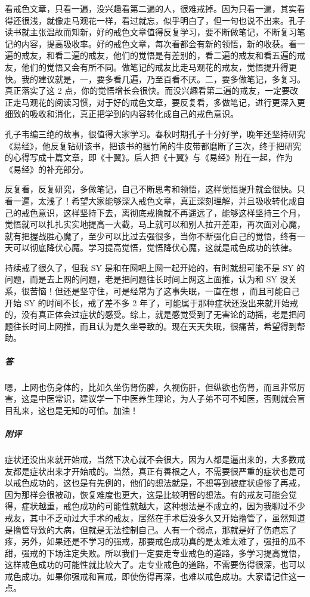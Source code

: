 \begin{case}
    看戒色文章，只看一遍，没兴趣看第二遍的人，很难戒掉。因为只看一遍，其实看得还很浅，就像走马观花一样，看过就忘，似乎明白了，但一句也说不出来。孔子读书就主张温故而知新，好的戒色文章值得反复学习，要不断做笔记，不断复习笔记的内容，提高吸收率。好的戒色文章，每次看都会有新的领悟，新的收获。看一遍的戒友，和看二遍的戒友，他们的觉悟是有差别的，看二遍的戒友和看五遍的戒友，他们的觉悟又会有所不同。做笔记的戒友比走马观花的戒友，觉悟提升得更快。我的建议就是，一，要多看几遍，乃至百看不厌。二，要多做笔记，多复习。真正落实了这 2 点，你的觉悟增长会很快。而没兴趣看第二遍的戒友，一定要改正走马观花的阅读习惯，对于好的戒色文章，要反复看，多做笔记，进行更深入更细致的吸收和消化，真正把学到的内容转化成自己的戒色意识。

    孔子韦编三绝的故事，很值得大家学习。春秋时期孔子十分好学，晚年还坚持研究《易经》，他反复钻研该书，把该书的捆竹简的牛皮带都磨断了三次，终于把研究的心得写成十篇文章，即《十翼》。后人把《十翼》与《易经》附在一起，作为《易经》的补充部分。

    反复看，反复研究，多做笔记，自己不断思考和领悟，这样觉悟提升就会很快。只看一遍，太浅了！希望大家能够深入戒色文章，真正深刻理解，并且吸收转化成自己的戒色意识，这样坚持下去，离彻底戒撸就不再遥远了，能够这样坚持三个月，觉悟就可以扎扎实实地提高一大截，马上就可以和别人拉开差距，再次面对心魔，就有把握战胜心魔了，至少可以比过去强很多，当你不断强化自己的觉悟，终有一天可以彻底降伏心魔。学习提高觉悟，觉悟降伏心魔，这就是戒色成功的铁律。
\end{case}

\begin{case}
    持续戒了很久了，但我 SY 是和在网吧上网一起开始的，有时就想可能不是 SY 的问题，而是去上网的问题，老是把问题往长时间上网这上面推，认为和 SY 没关系，很苦恼！但还是坚守住，可是经常为了这事失眠，一直在想 ，而且可能自己开始 SY 的时间不长，戒了差不多 2 年了，可能属于那种症状还没出来就开始戒的，没有真正体会过症状的感受。综上，就是感觉受到了无害论的动摇，老是把问题往长时间上网推，而且认为是久坐导致的。现在天天失眠，很痛苦，希望得到帮助。
    \subparagraph{答} 嗯，上网也伤身体的，比如久坐伤肾伤脾，久视伤肝，但纵欲也伤肾，而且非常厉害，这是中医常识，建议学一下中医养生理论，为人子弟不可不知医，否则就会盲目乱来，这也是无知的可怕。加油！
    \subparagraph{附评} 症状还没出来就开始戒，当然下决心就不会很大，因为人都是逼出来的，大多数戒友都是症状出来才开始戒的。当然，真正有善根之人，不需要很严重的症状也是可以戒色成功的，这也是有先例的，他们的想法就是，不想等到被症状虐惨了再戒，因为那样会很被动，恢复难度也更大，这是比较明智的想法。有的戒友可能会觉得，症状越重，戒色成功的可能性就越大，这种想法是不成立的，因为我聊过不少戒友，其中不乏动过大手术的戒友，居然在手术后没多久又开始撸管了，虽然知道是撸管导致的大病，但就是无法控制自己。人有一个弱点，那就是好了伤疤忘了疼，另外，如果还是不学习的强戒，那要戒色成功真的是太难太难了，强扭的瓜不甜，强戒的下场注定失败。所以我们一定要走专业戒色的道路，多学习提高觉悟，这样戒色成功的可能性就比较大了。走专业戒色的道路，不需要伤得很深，也可以戒色成功。如果你强戒和盲戒，即使伤得再深，也难以戒色成功。大家请记住这一点。
\end{case}

